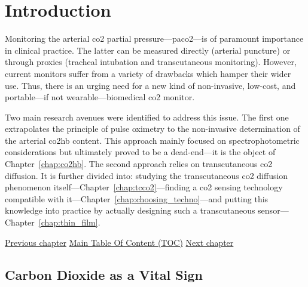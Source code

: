 \chapter{Introduction}\label{chap:intro}

\begin{tldrbox}
	
	Monitoring the arterial \gls{co2} partial pressure---\gls{paco2}---is of paramount importance in clinical practice. The latter can be measured directly (arterial puncture) or through proxies (tracheal intubation and transcutaneous monitoring). However, current monitors suffer from a variety of drawbacks which hamper their wider use. Thus, there is an urging need for a new kind of non-invasive, low-cost, and portable---if not wearable---biomedical \gls{co2} monitor.
	
	Two main research avenues were identified to address this issue. The first one extrapolates the principle of pulse oximetry to the non-invasive determination of the arterial \gls{co2hb} content. This approach mainly focused on spectrophotometric considerations but ultimately proved to be a dead-end---it is the object of Chapter~\ref{chap:co2hb}. The second approach relies on transcutaneous \gls{co2} diffusion. It is further divided into: studying the transcutaneous \gls{co2} diffusion phenomenon itself---Chapter~\ref{chap:tcco2}---finding a \gls{co2} sensing technology compatible with it---Chapter~\ref{chap:choosing_techno}---and putting this knowledge into practice by actually designing such a transcutaneous sensor---Chapter~\ref{chap:thin_film}.
	
	\tcblower
	
	\hyperref[forechap:ack]{Previous chapter} \hfill \hyperref[chapter:toc]{Main Table Of Content (TOC)} \hfill \hyperref[chap:co2hb]{Next chapter}
	
\end{tldrbox}\glsresetall

\section{Carbon Dioxide as a Vital Sign}

